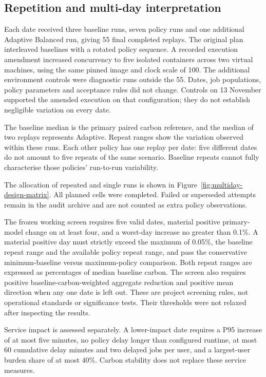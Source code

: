 \subsection{Repetition and multi-day interpretation}
Each date received three baseline runs, seven policy runs and one additional Adaptive Balanced run, giving 55 final completed replays. The original plan interleaved baselines with a rotated policy sequence. A recorded execution amendment increased concurrency to five isolated containers across two virtual machines, using the same pinned image and clock scale of 100. The additional environment controls were diagnostic runs outside the 55. Dates, job populations, policy parameters and acceptance rules did not change. Controls on 13 November supported the amended execution on that configuration; they do not establish negligible variation on every date.

The baseline median is the primary paired carbon reference, and the median of two replays represents Adaptive. Repeat ranges show the variation observed within these runs. Each other policy has one replay per date: five different dates do not amount to five repeats of the same scenario. Baseline repeats cannot fully characterise those policies' run-to-run variability.


The allocation of repeated and single runs is shown in Figure~\ref{fig:multiday-design-matrix}. All planned cells were completed. Failed or superseded attempts remain in the audit archive and are not counted as extra policy observations.

\FloatBarrier

The frozen working screen requires five valid dates, material positive primary-model change on at least four, and a worst-day increase no greater than 0.1\%. A material positive day must strictly exceed the maximum of 0.05\%, the baseline repeat range and the available policy repeat range, and pass the conservative minimum-baseline versus maximum-policy comparison. Both repeat ranges are expressed as percentages of median baseline carbon. The screen also requires positive baseline-carbon-weighted aggregate reduction and positive mean direction when any one date is left out. These are project screening rules, not operational standards or significance tests. Their thresholds were not relaxed after inspecting the results.

Service impact is assessed separately. A lower-impact date requires a P95 increase of at most five minutes, no policy delay longer than configured runtime, at most 60 cumulative delay minutes and two delayed jobs per user, and a largest-user burden share of at most 40\%. Carbon stability does not replace these service measures.

